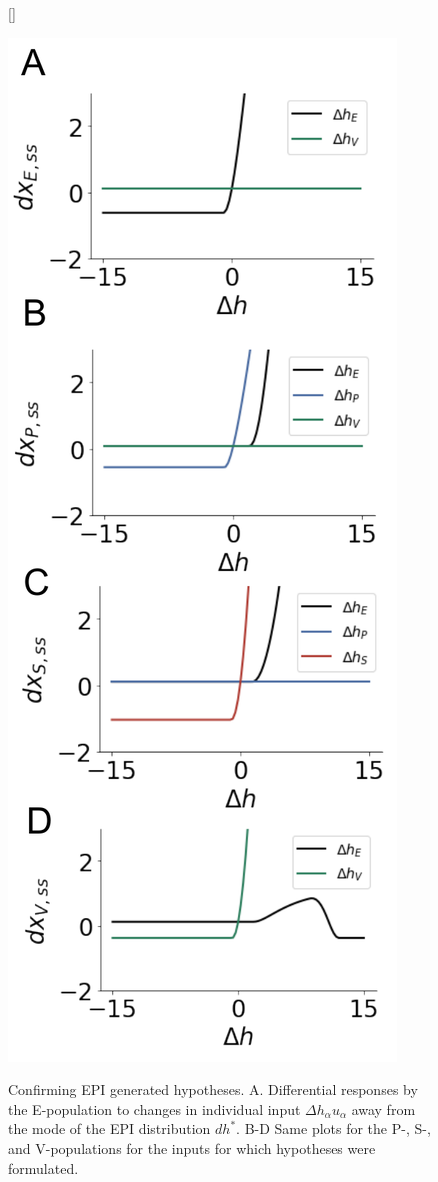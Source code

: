 \documentclass[11pt]{article}
\begin{document}
\begin{figure}
[\FBwidth]
{\caption{Confirming EPI generated hypotheses. A. Differential responses by the E-population to changes in individual input $\Delta h_\alpha u_\alpha$ away from the mode of the EPI distribution $dh^*$. B-D Same plots for the P-, S-, and V-populations for the inputs for which hypotheses were formulated.}}
{\includegraphics[scale=0.45]{figures/fig3/fig3.pdf}}
\end{figure}
\end{document}
